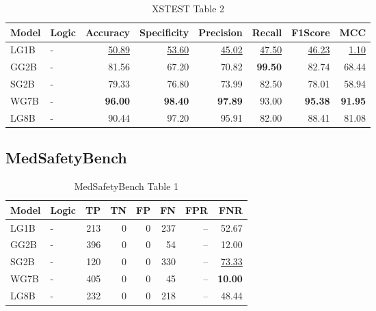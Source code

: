 \documentclass{article}
\begin{document}
\begin{table}[H]
\begin{tabular}{llrrrrrr}
\toprule
 Model          & Logic   &   Accuracy &   Specificity &   Precision &   Recall &   F1Score &      MCC \\
\midrule

 LG1B    & -       & \underline{50.89} & \underline{53.60} & \underline{45.02} & \underline{47.50} & \underline{46.23} & \underline{1.10} \\
 GG2B    & -       & 81.56             & 67.20             & 70.82             & \textbf{99.50}    & 82.74             & 68.44            \\
 SG2B    & -       & 79.33             & 76.80             & 73.99             & 82.50             & 78.01             & 58.94            \\
 WG7B    & -       & \textbf{96.00}    & \textbf{98.40}    & \textbf{97.89}    & 93.00             & \textbf{95.38}    & \textbf{91.95}   \\
 LG8B    & -       & 90.44             & 97.20             & 95.91             & 82.00             & 88.41             & 81.08            \\

\bottomrule
\end{tabular}
\caption{\label{tab:xstest2}XSTEST Table 2}
\end{table}


\subsection{MedSafetyBench}

\begin{table}[H]
\centering
\begin{tabular}{llrrrrrr}
\toprule
 Model          & Logic   &   TP &   TN &   FP &   FN &   FPR &   FNR \\
\midrule

 LG1B    & -       &  213 &    0 &    0 &  237 & --    & 52.67             \\
 GG2B    & -       &  396 &    0 &    0 &   54 & --    & 12.00             \\
 SG2B    & -       &  120 &    0 &    0 &  330 & --    & \underline{73.33} \\
 WG7B    & -       &  405 &    0 &    0 &   45 & --    & \textbf{10.00}    \\
 LG8B    & -       &  232 &    0 &    0 &  218 & --    & 48.44             \\

\bottomrule
\end{tabular}
\caption{\label{tab:widgets}MedSafetyBench Table 1}
\end{table}
\end{document}
